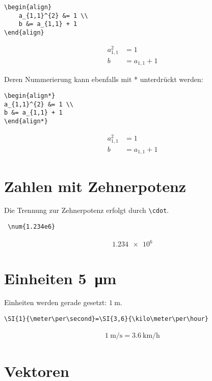 \begin{lstlisting}[style=latex]
\begin{align}
	a_{1,1}^{2} &= 1 \\
	b &= a_{1,1} + 1 
\end{align}
\end{lstlisting}
\begin{align}
    a_{1,1}^{2} &= 1 \\
    b &= a_{1,1} + 1
\end{align}

Deren Nummerierung kann ebenfalls mit * unterdrückt werden:

\begin{lstlisting}[style=latex]
\begin{align*}
a_{1,1}^{2} &= 1 \\
b &= a_{1,1} + 1 
\end{align*}
\end{lstlisting}
\begin{align*}
    a_{1,1}^{2} &= 1 \\
    b &= a_{1,1} + 1
\end{align*}

\section{Zahlen mit Zehnerpotenz}
Die Trennung zur Zehnerpotenz erfolgt durch \verb|\cdot|.
\begin{verbatim}
 \num{1.234e6}
\end{verbatim}
\begin{align}
    \num{1.234e6}
\end{align}

\section{Einheiten \SI{5}{\micro\meter}}

Einheiten werden gerade gesetzt: $\SI{1}{\meter}$.
\begin{verbatim}
\SI{1}{\meter\per\second}=\SI{3,6}{\kilo\meter\per\hour}
\end{verbatim}
\begin{align}
    \SI{1}{\meter\per\second}=\SI{3,6}{\kilo\meter\per\hour}
\end{align}

\section{Vektoren}

